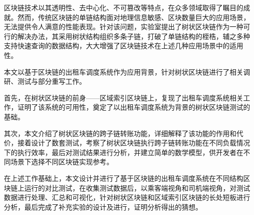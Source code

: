 %
%
%
%
%
%

\begin{conclusion}

  区块链技术以其透明性、去中心化、不可篡改等特点，在众多领域取得了瞩目的成就。然而，传统区块链的单链结构面对地理信息敏感、区块数量巨大的应用场景，无法提供令人满意的性能表现。针对该问题，实验室提出了树状区块链作为一种可行的解决办法，其采用树状结构组织多条子链，打破了单链结构的桎梏，辅之多种支持快速查询的数据结构，大大增强了区块链技术在上述几种应用场景中的适用性。

  本文以基于区块链的出租车调度系统作为应用背景，针对树状区块链进行了相关调研、测试与部分重写工作。

  首先，在树状区块链的前身——区域索引区块链上，复现了出租车调度系统相关工作，证明了该系统的可用性，奠定了以出租车调度系统为背景的树状区块链测试的基础。

  其次，本文介绍了树状区块链的跨子链转账功能，详细解释了该功能的作用和代价，接着设计了数套测试，考察了树状区块链执行跨子链转账功能在不同负载情况下的执行效率，最后对测试结果进行分析，并建立简单的数学模型，供开发者在不同场景下选择不同区块链实现参考。

  在上述工作基础上，本文设计并进行了基于区块链的出租车调度系统在不同结构区块链上运行的对比测试，在收集测试数据后，以乘客端视角和司机端视角，对测试数据进行处理、汇总和可视化，针对树状区块链和区域索引区块链的长处短板进行分析，最后完成了补充实验的设计及进行，证明分析得出的猜想。


\end{conclusion}
